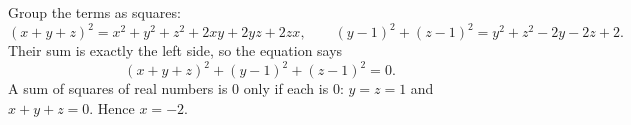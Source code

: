 Group the terms as squares:
\[(x+y+z)^2=x^2+y^2+z^2+2xy+2yz+2zx,\qquad(y-1)^2+(z-1)^2=y^2+z^2-2y-2z+2.\]
Their sum is exactly the left side, so the equation says
\[(x+y+z)^2+(y-1)^2+(z-1)^2=0.\]
A sum of squares of real numbers is $0$ only if each is $0$: $y=z=1$ and $x+y+z=0$. Hence $\boxed{x=-2}$.
